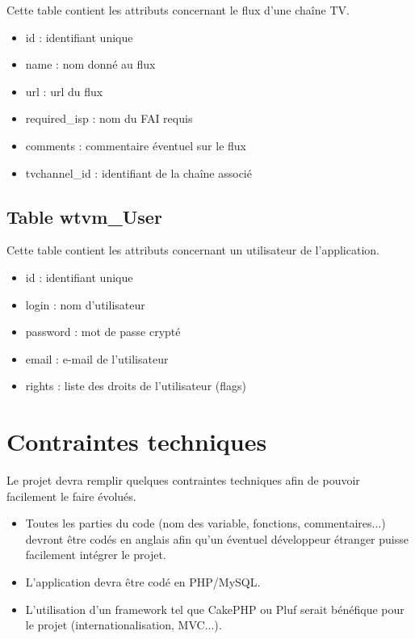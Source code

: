 \documentclass[10pt,a4paper]{article}
\begin{document}
Cette table contient les attributs concernant le flux d'une chaîne TV.

\begin{itemize}
\item id : identifiant unique
\item name : nom donné au flux
\item url : url du flux
\item required\_isp : nom du FAI requis
\item comments : commentaire éventuel sur le flux
\item tvchannel\_id : identifiant de la chaîne associé
\end{itemize}

\subsection{Table wtvm\_User}

Cette table contient les attributs concernant un utilisateur de l'application.

\begin{itemize}
\item id : identifiant unique
\item login : nom d'utilisateur
\item password : mot de passe crypté
\item email : e-mail de l'utilisateur
\item rights : liste des droits de l'utilisateur (flags)
\end{itemize}

\section{Contraintes techniques}

Le projet devra remplir quelques contraintes techniques afin de pouvoir facilement le faire évolués.

\begin{itemize}
\item Toutes les parties du code (nom des variable, fonctions, commentaires...) devront être codés en anglais afin qu'un éventuel développeur étranger puisse facilement intégrer le projet.
\item L'application devra être codé en PHP/MySQL.
\item L'utilisation d'un framework tel que CakePHP ou Pluf serait bénéfique pour le projet (internationalisation, MVC...).
\end{itemize}
\end{document}
